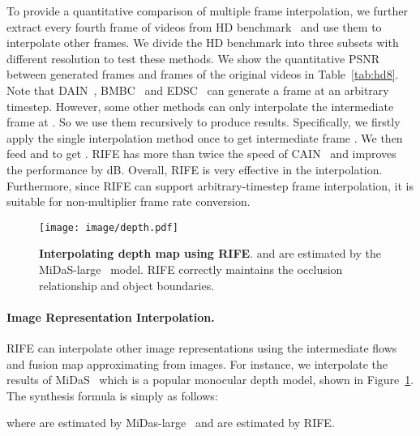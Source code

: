 \documentclass[final]{cvpr}
\begin{document}
To provide a quantitative comparison of multiple frame interpolation, we further extract every fourth frame of videos from HD benchmark~\cite{bao2019memc} and use them to interpolate other frames. We divide the HD benchmark into three subsets with different resolution to test these methods. We show the quantitative PSNR between generated frames and frames of the original videos in Table~\ref{tab:hd8}. Note that DAIN~\cite{bao2019depth}, BMBC~\cite{park2020bmbc} and EDSC~\cite{cheng2020video} can generate a frame at an arbitrary timestep. However, some other methods can only interpolate the intermediate frame at . So we use them recursively to produce  results. Specifically, we firstly apply the single interpolation method once to get intermediate frame . We then feed  and  to get . RIFE has more than twice the speed of CAIN~\cite{choi2020channel} and improves the performance by  dB. Overall, RIFE is very effective in the  interpolation. Furthermore, since RIFE can support arbitrary-timestep frame interpolation, it is suitable for non-multiplier frame rate conversion.

\begin{figure}[t]
	\centering
	\texttt{[image: image/depth.pdf]}
	\caption{\textbf{Interpolating depth map using RIFE}.  and  are estimated by the MiDaS-large~\cite{Ranftl2020} model. RIFE correctly maintains the occlusion relationship and object boundaries.} \label{fig:depth}
\end{figure}

\paragraph{Image Representation Interpolation.} RIFE can interpolate other image representations using the intermediate flows and fusion map approximating from images. For instance, we interpolate the results of MiDaS~\cite{Ranftl2020} which is a popular monocular depth model, shown in Figure~\ref{fig:depth}. The synthesis formula is simply as follows:


where  are estimated by MiDas-large~\cite{Ranftl2020} and  are estimated by RIFE.
\end{document}
